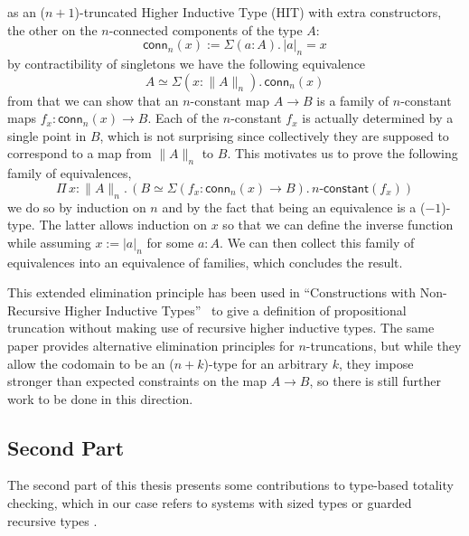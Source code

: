 \documentclass{book}
\newcommand{\tr}[2]{\| #2 \|_{#1}}
\newcommand{\trcon}[2]{| #2 |_{#1}}
\newcommand{\conn}{\mathsf{conn}}
\newcommand{\sd}{.\,}
\begin{document}
as an ($n{+}1$)-truncated Higher Inductive Type (HIT) \cite{hottbook}
with extra constructors, the other on the
$n$-connected components of the type $A$:
\[
\conn_n(x) := \Sigma (a : A)\sd \trcon{n}{a} = x
\]
by contractibility of singletons we have the following equivalence
\[
A \simeq \Sigma (x : \tr{n}{A})\sd \conn_n(x)
\]
from that we can show that an $n$-constant map $A \to B$ is a family of $n$-constant
maps $f_x : \conn_n(x) \to B$. Each of the $n$-constant $f_x$ is actually
determined by a single point in $B$, which is not surprising since
collectively they are supposed to correspond to a map from
$\tr{n}{A}$ to $B$. This motivates us to prove the following family of equivalences,
\[
\Pi\,x : \tr{n}{A}\sd (B \simeq \Sigma (f_x : \conn_n(x) \to B)\sd\textsf{$n$-constant}(f_x))
\]
we do so by induction on $n$ and by the fact that being an equivalence
is a ($-1$)-type. The latter allows induction on $x$ so that we can
define the inverse function while assuming $x := \trcon{n}{a}$ for some
$a : A$.
We can then collect this
family of equivalences into an equivalence of families, which
concludes the result.

This extended elimination principle has been used in ``Constructions
with Non-Recursive Higher Inductive Types''~\cite{kraus:lics16} to give a
definition of propositional truncation without making use of recursive
higher inductive types. The same paper provides alternative
elimination principles for $n$-truncations, but while they allow the
codomain to be an ($n{+}k$)-type for an arbitrary $k$, they impose
stronger than expected constraints on the map $A \to B$, so there is
still further work to be done in this direction.



\subsection{Second Part}

The second part of this thesis presents some contributions to
type-based totality checking, which in our case refers to systems with
sized types \cite{hughesParetoSabry:popl96} or guarded recursive types
\cite{nakano:lics00}.
\end{document}
